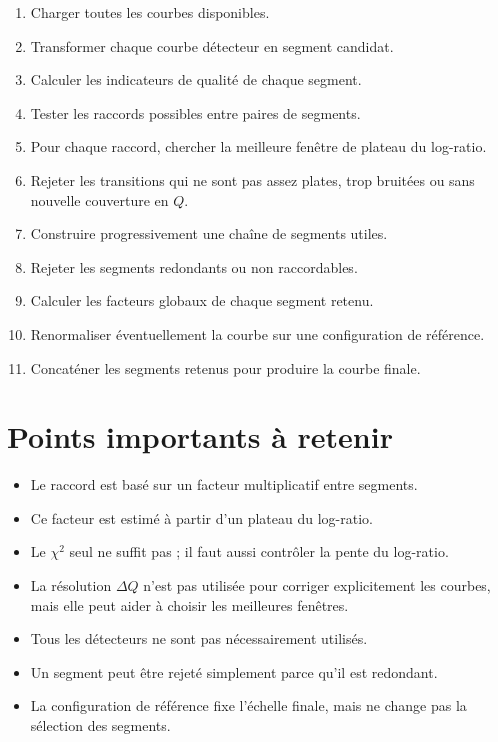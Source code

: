 \documentclass[11pt,a4paper]{article}
\begin{document}
\begin{enumerate}[leftmargin=1.5em]
    \item Charger toutes les courbes disponibles.
    \item Transformer chaque courbe détecteur en segment candidat.
    \item Calculer les indicateurs de qualité de chaque segment.
    \item Tester les raccords possibles entre paires de segments.
    \item Pour chaque raccord, chercher la meilleure fenêtre de plateau du
    log-ratio.
    \item Rejeter les transitions qui ne sont pas assez plates, trop bruitées
    ou sans nouvelle couverture en $Q$.
    \item Construire progressivement une chaîne de segments utiles.
    \item Rejeter les segments redondants ou non raccordables.
    \item Calculer les facteurs globaux de chaque segment retenu.
    \item Renormaliser éventuellement la courbe sur une configuration de
    référence.
    \item Concaténer les segments retenus pour produire la courbe finale.
\end{enumerate}

\section{Points importants à retenir}

\begin{itemize}[leftmargin=1.5em]
    \item Le raccord est basé sur un facteur multiplicatif entre segments.
    \item Ce facteur est estimé à partir d'un plateau du log-ratio.
    \item Le $\chi^2$ seul ne suffit pas ; il faut aussi contrôler la pente du
    log-ratio.
    \item La résolution $\Delta Q$ n'est pas utilisée pour corriger explicitement
    les courbes, mais elle peut aider à choisir les meilleures fenêtres.
    \item Tous les détecteurs ne sont pas nécessairement utilisés.
    \item Un segment peut être rejeté simplement parce qu'il est redondant.
    \item La configuration de référence fixe l'échelle finale, mais ne change pas
    la sélection des segments.
\end{itemize}
\end{document}
